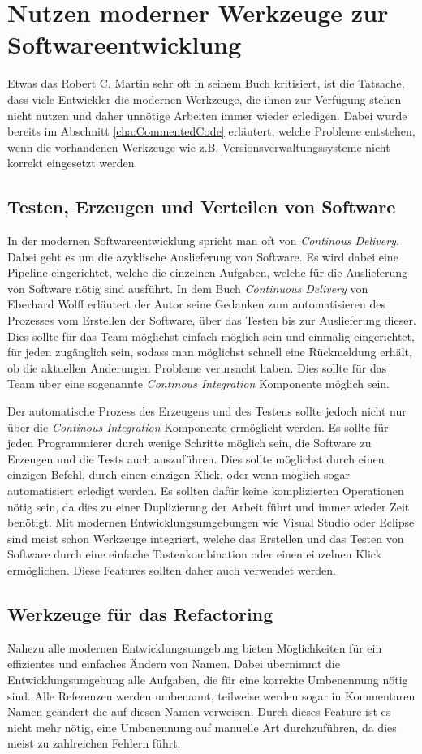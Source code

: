\section{Nutzen moderner Werkzeuge zur Softwareentwicklung}
Etwas das Robert C. Martin sehr oft in seinem Buch kritisiert, ist die Tatsache, dass viele Entwickler die modernen Werkzeuge, die ihnen zur Verfügung stehen nicht nutzen und daher unnötige Arbeiten immer wieder erledigen. Dabei wurde bereits im Abschnitt \ref{cha:CommentedCode} erläutert, welche Probleme entstehen, wenn die vorhandenen Werkzeuge wie z.B. Versionsverwaltungssysteme nicht korrekt eingesetzt werden.

\subsection{Testen, Erzeugen und Verteilen von Software}
In der modernen Softwareentwicklung spricht man oft von \textit{Continous Delivery}. Dabei geht es um die azyklische Auslieferung von Software. Es wird dabei eine Pipeline eingerichtet, welche die einzelnen Aufgaben, welche für die Auslieferung von Software nötig sind ausführt. In dem Buch \textit{Continuous Delivery} von Eberhard Wolff erläutert der Autor seine Gedanken zum automatisieren des Prozesses vom Erstellen der Software, über das Testen bis zur Auslieferung dieser. Dies sollte für das Team möglichst einfach möglich sein und einmalig eingerichtet, für jeden zugänglich sein, sodass man möglichst schnell eine Rückmeldung erhält, ob die aktuellen Änderungen Probleme verursacht haben. Dies sollte für das Team über eine sogenannte \textit{Continous Integration} Komponente möglich sein.

\SuperPar Der automatische Prozess des Erzeugens und des Testens sollte jedoch nicht nur über die \textit{Continous Integration} Komponente ermöglicht werden. Es sollte für jeden Programmierer durch wenige Schritte möglich sein, die Software zu Erzeugen und die Tests auch auszuführen. Dies sollte möglichst durch einen einzigen Befehl, durch einen einzigen Klick, oder wenn möglich sogar automatisiert erledigt werden. Es sollten dafür keine komplizierten Operationen nötig sein, da dies zu einer Duplizierung der Arbeit führt und immer wieder Zeit benötigt. Mit modernen Entwicklungsumgebungen wie Visual Studio oder Eclipse sind meist schon Werkzeuge integriert, welche das Erstellen und das Testen von Software durch eine einfache Tastenkombination oder einen einzelnen Klick ermöglichen. Diese Features sollten daher auch verwendet werden.

\subsection{Werkzeuge für das Refactoring}
Nahezu alle modernen Entwicklungsumgebung bieten Möglichkeiten für ein effizientes und einfaches Ändern von Namen. Dabei übernimmt die Entwicklungsumgebung alle Aufgaben, die für eine korrekte Umbenennung nötig sind. Alle Referenzen werden umbenannt, teilweise werden sogar in Kommentaren Namen geändert die auf diesen Namen verweisen. Durch dieses Feature ist es nicht mehr nötig, eine Umbenennung auf manuelle Art durchzuführen, da dies meist zu zahlreichen Fehlern führt. 
